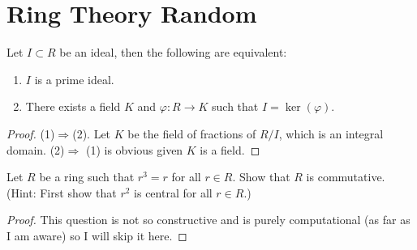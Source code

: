 \chapter{Ring Theory Random}


\begin{prop}
    Let $I\subset R$ be an ideal, then the following are equivalent:
    \begin{enumerate}
        \item $I$ is a prime ideal.
        \item There exists a field $K$ and $\varphi:R\to K$ such that $I=\ker(\varphi)$.
    \end{enumerate}
\end{prop}
\begin{proof}
    (1)$\Rightarrow$(2). Let $K$ be the field of fractions of $R/I$, which is an integral domain. (2)$\Rightarrow$ (1) is obvious given $K$ is a field.
\end{proof}

\begin{prob}[S2010-Q2]
    Let \(R\) be a ring such that \(r^3 = r\) for all \(r \in R\). Show that \(R\) is commutative. (Hint: First show that \(r^2\) is central for all \(r \in R\).)
\end{prob}
\begin{proof}
    This question is not so constructive and is purely computational (as far as I am aware) so I will skip it here.
\end{proof}

